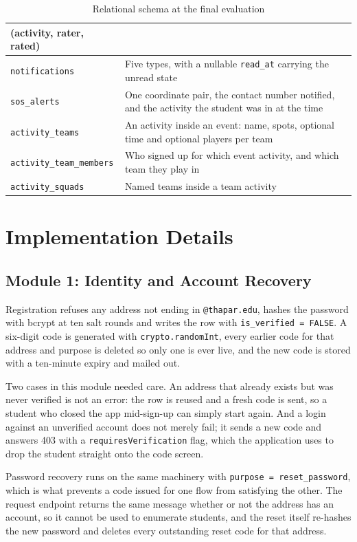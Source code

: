 \documentclass{tietreport}
\begin{document}
\begin{table}[htbp]
\begin{tabular}{|L{4.9cm}|L{6.6cm}|}
(activity, rater, rated) \\
\hline
\texttt{notifications} & Five types, with a nullable \texttt{read\_at} carrying the
unread state \\
\hline
\texttt{sos\_alerts} & One coordinate pair, the contact number notified, and the
activity the student was in at the time \\
\hline
\texttt{activity\_teams} & An activity inside an event: name, spots, optional time and
optional players per team \\
\hline
\texttt{activity\_team\_members} & Who signed up for which event activity, and which
team they play in \\
\hline
\texttt{activity\_squads} & Named teams inside a team activity \\
\hline
\end{tabular}
\caption{Relational schema at the final evaluation}
\label{tab:schema}
\end{table}

\section{Implementation Details}
\label{sec:impl}

\subsection{Module 1: Identity and Account Recovery}

Registration refuses any address not ending in \texttt{@thapar.edu}, hashes the
password with bcrypt at ten salt rounds and writes the row with
\texttt{is\_verified = FALSE}. A six-digit code is generated with
\texttt{crypto.randomInt}, every earlier code for that address and purpose is deleted
so only one is ever live, and the new code is stored with a ten-minute expiry and
mailed out.

Two cases in this module needed care. An address that already exists but was never
verified is not an error: the row is reused and a fresh code is sent, so a student who
closed the app mid-sign-up can simply start again. And a login against an unverified
account does not merely fail; it sends a new code and answers 403 with a
\texttt{requiresVerification} flag, which the application uses to drop the student
straight onto the code screen.

Password recovery runs on the same machinery with \texttt{purpose = reset\_password},
which is what prevents a code issued for one flow from satisfying the other. The
request endpoint returns the same message whether or not the address has an account,
so it cannot be used to enumerate students, and the reset itself re-hashes the new
password and deletes every outstanding reset code for that address.
\end{document}
